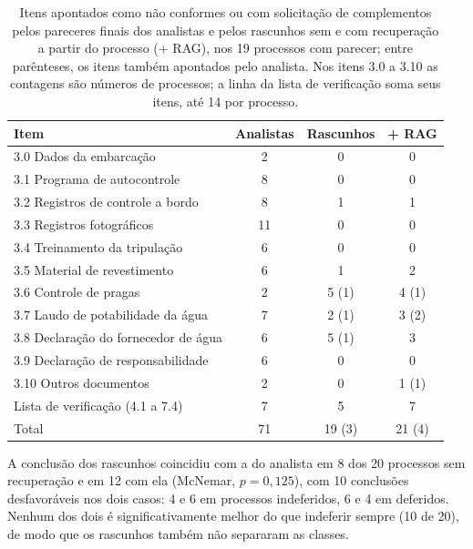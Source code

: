 \begin{table}[htb]
	\centering
	\caption{Itens apontados como não conformes ou com solicitação de complementos pelos pareceres finais dos analistas e pelos rascunhos sem e com recuperação a partir do processo (+ RAG), nos 19 processos com parecer; entre parênteses, os itens também apontados pelo analista. Nos itens 3.0 a 3.10 as contagens são números de processos; a linha da lista de verificação soma seus itens, até 14 por processo.}
	\label{tab:rascunhos}
	\small
	\begin{tabular}{|l|c|c|c|}
		\hline
		\textbf{Item} & \textbf{Analistas} & \textbf{Rascunhos} & \textbf{+ RAG} \\
		\hline
		3.0 Dados da embarcação & 2 & 0 & 0 \\
		3.1 Programa de autocontrole & 8 & 0 & 0 \\
		3.2 Registros de controle a bordo & 8 & 1 & 1 \\
		3.3 Registros fotográficos & 11 & 0 & 0 \\
		3.4 Treinamento da tripulação & 6 & 0 & 0 \\
		3.5 Material de revestimento & 6 & 1 & 2 \\
		3.6 Controle de pragas & 2 & 5 (1) & 4 (1) \\
		3.7 Laudo de potabilidade da água & 7 & 2 (1) & 3 (2) \\
		3.8 Declaração do fornecedor de água & 6 & 5 (1) & 3 \\
		3.9 Declaração de responsabilidade & 6 & 0 & 0 \\
		3.10 Outros documentos & 2 & 0 & 1 (1) \\
		Lista de verificação (4.1 a 7.4) & 7 & 5 & 7 \\
		\hline
		Total & 71 & 19 (3) & 21 (4) \\
		\hline
	\end{tabular}
\end{table}

A conclusão dos rascunhos coincidiu com a do analista em 8 dos 20 processos sem recuperação e em 12 com ela (McNemar, $p=0{,}125$), com 10 conclusões desfavoráveis nos dois casos: 4 e 6 em processos indeferidos, 6 e 4 em deferidos. Nenhum dos dois é significativamente melhor do que indeferir sempre (10 de 20), de modo que os rascunhos também não separaram as classes.

